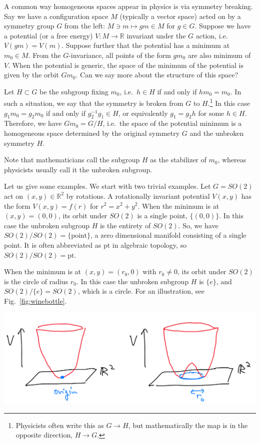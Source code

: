 \documentclass[12pt]{article}
\numberwithin{equation}{section}
\renewenvironment{figure}[1][]{
  \begin{originalfigure}[#1]
    \begin{mdframed}[linecolor=black!0,backgroundcolor=black!1]
}{
    \end{mdframed}
  \end{originalfigure}
}
\def\bR{\mathbb{R}}
\def\pt{\mathrm{pt}}
\begin{document}
A common way homogeneous spaces appear in physics is via symmetry breaking.
Say we have a configuration space $M$ (typically a vector space) acted on by a symmetry group $G$ from the left:
$M\ni m\mapsto gm\in M$ for $g\in G$.
Suppose we have a potential (or a free energy) $V:M\to \bR$ invariant under the $G$ action, i.e.~$V(gm)=V(m)$.
Suppose further that the potential has a minimum at $m_0 \in M$. 
From the $G$-invariance, all points of the form $gm_0$ are also minimum of $V$.
When the potential is generic, the space of the minimum of the potential is given by the orbit $Gm_0$.
Can we say more about the structure of this space?

Let $H\subset G$ be the subgroup fixing $m_0$, i.e.~$h\in H$ if and only if $hm_0=m_0$.
In such a situation, we say that the symmetry is broken from $G$ to $H$.\footnote{%
Physicists often write this as $G\to H$, 
but mathematically the map is in the opposite direction, $H\to G$.}
In this case $g_1 m_0 = g_2 m_0$ if and only if $g_2^{-1} g_1 \in H$, 
or equivalently $g_1 = g_2 h$ for some $h\in H$.
Therefore, we have $Gm_0=G/H$, i.e.~the space of the potential minimum is a homogeneous space
determined by the original symmetry $G$ and the unbroken symmetry $H$.

Note that mathematicians call the subgroup $H$ as the stabilizer of $m_0$,
whereas physicists usually call it the unbroken subgroup.

Let us give some examples.
We start with two trivial examples.
Let $G=SO(2)$ act on $(x,y)\in \bR^2$ by rotations.
A rotationally invariant potential $V(x,y)$ has the form
$V(x,y)=f(r)$ for $r^2=x^2+y^2$.
When the minimum is at $(x,y)=(0,0)$, its orbit under $SO(2)$ is a single point, $\{(0,0)\}$.
In this case the unbroken subgroup $H$ is the entirety of $SO(2)$.
So, we have $SO(2)/SO(2)=\{\text{point}\}$, a zero dimensional manifold consisting of a single point.
It is often abbreviated as $\pt$ in algebraic topology, so $SO(2)/SO(2)=\pt$.

When the minimum is at $(x,y)=(r_0,0)$ with $r_0\neq 0$,
its orbit under $SO(2)$ is the circle of radius $r_0$.
In this case the unbroken subgroup $H$ is $\{e\}$,
and $SO(2)/\{e\}=SO(2)$, which is a circle.
For an illustration, see Fig.~\ref{fig:winebottle}.

\begin{figure}[h]
\centering
\includegraphics[width=.7\textwidth]{winebottle.png}
\caption{Two choices of $SO(2)$-invariant potential functions $V(x,y)$,
with minimum either at the origin or at the circle of radius $r_0$.}
\label{fig:winebottle}
\end{figure}
\end{document}
